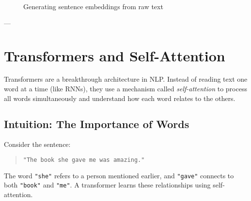 \begin{figure}[H]
    \centering
    \caption{Generating sentence embeddings from raw text}
    \label{fig:embedding-pipeline}
\end{figure}

---

\section{Transformers and Self-Attention}
\label{sec:theory-transformers}

Transformers are a breakthrough architecture in NLP. Instead of reading text one word at a time (like RNNs), they use a mechanism called \textit{self-attention} to process all words simultaneously and understand how each word relates to the others.

\subsection*{Intuition: The Importance of Words}

Consider the sentence:
\begin{quote}
    \texttt{"The book she gave me was amazing."}
\end{quote}
The word \texttt{"she"} refers to a person mentioned earlier, and \texttt{"gave"} connects to both \texttt{"book"} and \texttt{"me"}. A transformer learns these relationships using self-attention.


